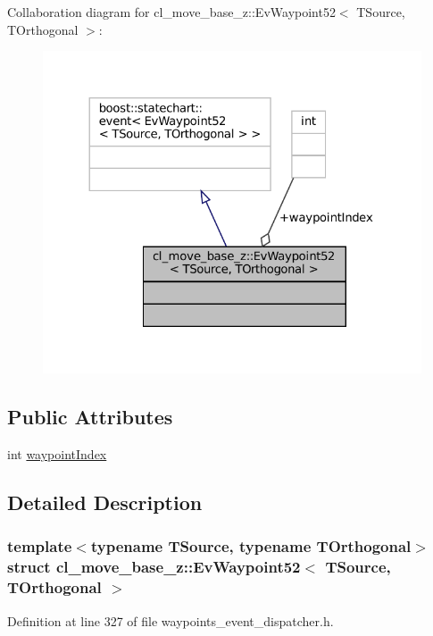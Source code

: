 Collaboration diagram for cl\+\_\+move\+\_\+base\+\_\+z\+:\+:Ev\+Waypoint52$<$ T\+Source, T\+Orthogonal $>$\+:
\nopagebreak
\begin{figure}[H]
\begin{center}
\leavevmode
\includegraphics[width=324pt]{structcl__move__base__z_1_1EvWaypoint52__coll__graph}
\end{center}
\end{figure}
\subsection*{Public Attributes}
\begin{DoxyCompactItemize}
\item 
int \hyperlink{structcl__move__base__z_1_1EvWaypoint52_aeb62e7276a48fc62cec944bc4f8eeada}{waypoint\+Index}
\end{DoxyCompactItemize}


\subsection{Detailed Description}
\subsubsection*{template$<$typename T\+Source, typename T\+Orthogonal$>$\newline
struct cl\+\_\+move\+\_\+base\+\_\+z\+::\+Ev\+Waypoint52$<$ T\+Source, T\+Orthogonal $>$}



Definition at line 327 of file waypoints\+\_\+event\+\_\+dispatcher.\+h.



